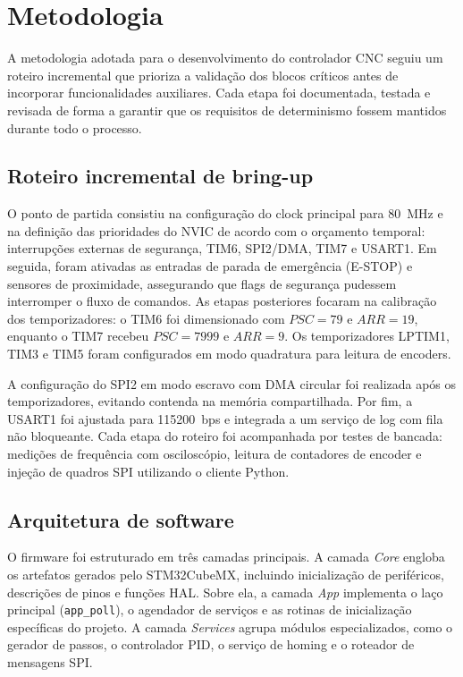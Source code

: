\chapter{Metodologia}\label{cap:metodologia}

A metodologia adotada para o desenvolvimento do controlador CNC seguiu
um roteiro incremental que prioriza a validação dos blocos críticos antes
de incorporar funcionalidades auxiliares. Cada etapa foi documentada,
testada e revisada de forma a garantir que os requisitos de determinismo
fossem mantidos durante todo o processo.

\section{Roteiro incremental de bring-up}

O ponto de partida consistiu na configuração do clock principal para
\SI{80}{\mega\hertz} e na definição das prioridades do NVIC de acordo
com o orçamento temporal: interrupções externas de segurança, TIM6,
SPI2/DMA, TIM7 e USART1. Em seguida, foram ativadas as entradas de parada
de emergência (E-STOP) e sensores de proximidade, assegurando que flags
de segurança pudessem interromper o fluxo de comandos. As etapas
posteriores focaram na calibração dos temporizadores: o TIM6 foi
dimensionado com $PSC = 79$ e $ARR = 19$, enquanto o TIM7 recebeu
$PSC = 7999$ e $ARR = 9$. Os temporizadores LPTIM1, TIM3 e TIM5 foram
configurados em modo quadratura para leitura de encoders.

A configuração do SPI2 em modo escravo com DMA circular foi realizada
após os temporizadores, evitando contenda na memória compartilhada.
Por fim, a USART1 foi ajustada para \SI{115200}{bps} e integrada a um
serviço de log com fila não bloqueante. Cada etapa do roteiro foi
acompanhada por testes de bancada: medições de frequência com
osciloscópio, leitura de contadores de encoder e injeção de quadros SPI
utilizando o cliente Python.

\section{Arquitetura de software}

O firmware foi estruturado em três camadas principais. A camada \emph{Core}
engloba os artefatos gerados pelo STM32CubeMX, incluindo inicialização de
periféricos, descrições de pinos e funções HAL. Sobre ela, a camada
\emph{App} implementa o laço principal (\texttt{app\_poll}), o agendador de
serviços e as rotinas de inicialização específicas do projeto. A camada
\emph{Services} agrupa módulos especializados, como o gerador de passos,
o controlador PID, o serviço de homing e o roteador de mensagens SPI.

